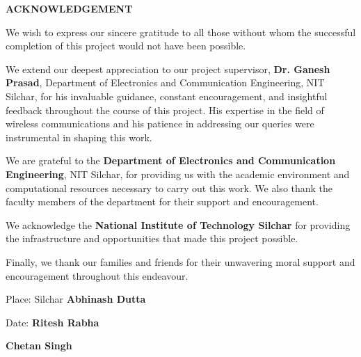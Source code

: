 \begin{center}
{\large{\bf{ACKNOWLEDGEMENT}}}
\end{center}

\noindent
We wish to express our sincere gratitude to all those without whom the successful completion of this project would not have been possible.

We extend our deepest appreciation to our project supervisor, \textbf{Dr. Ganesh Prasad}, Department of Electronics and Communication Engineering, NIT Silchar, for his invaluable guidance, constant encouragement, and insightful feedback throughout the course of this project. His expertise in the field of wireless communications and his patience in addressing our queries were instrumental in shaping this work.

We are grateful to the \textbf{Department of Electronics and Communication Engineering}, NIT Silchar, for providing us with the academic environment and computational resources necessary to carry out this work. We also thank the faculty members of the department for their support and encouragement.

We acknowledge the \textbf{National Institute of Technology Silchar} for providing the infrastructure and opportunities that made this project possible.

Finally, we thank our families and friends for their unwavering moral support and encouragement throughout this endeavour.

\vspace{4cm}

\noindent Place: Silchar \hfill \textbf{Abhinash Dutta}

\noindent Date: \hfill \textbf{Ritesh Rabha}

\noindent \hfill \textbf{Chetan Singh}

\clearpage
